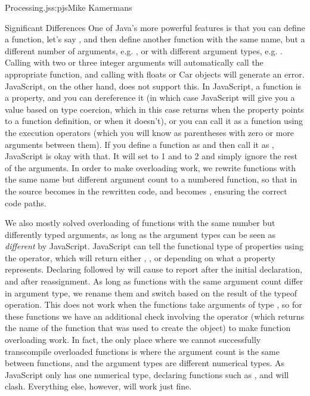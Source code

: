 \begin{aosachapter}{Processing.js}{s:pjs}{Mike Kamermans}
\begin{aosasect1}{Significant Differences}
One of Java's more powerful features is that you can define a
function, let's say , and then define another function
with the same name, but a different number of arguments, e.g. , or with different argument types, e.g. . Calling  with two or three integer arguments will
automatically call the appropriate function, and calling  with
floats or Car objects will generate an error. JavaScript, on the other
hand, does not support this. In JavaScript, a function is a property,
and you can dereference it (in which case JavaScript will give you a
value based on type coercion, which in this case returns  when
the property points to a function definition, or  when it
doesn't), or you can call it as a function using the execution
operators (which you will know as parentheses with zero or more
arguments between them). If you define a function as  and then
call it as , JavaScript is okay with that. It will set 
to 1 and  to 2 and simply ignore the rest of the arguments. In order
to make overloading work, we rewrite functions with the same name but
different argument count to a numbered function, so that
 in the source becomes  in the
rewritten code, and  becomes ,
ensuring the correct code paths.

We also mostly solved overloading of functions with the same number
but differently typed arguments, as long as the argument types can be
seen as \emph{different} by JavaScript. JavaScript can tell the functional
type of properties using the  operator, which will return
either , ,  or  depending on what a
property represents. Declaring  followed by  will
cause  to report  after the initial declaration, and
 after reassignment. As long as functions with the same
argument count differ in argument type, we rename them and switch
based on the result of the typeof operation. This does not work when
the functions take arguments of type , so for these functions
we have an additional check involving the  operator
(which returns the name of the function that was used to create the
object) to make function overloading work. In fact, the only place
where we cannot successfully transcompile overloaded functions is
where the argument count is the same between functions, and the
argument types are different numerical types. As JavaScript only has
one numerical type, declaring functions such as ,
 and  will
clash. Everything else, however, will work just fine.


\end{aosasect1}
\end{aosachapter}
